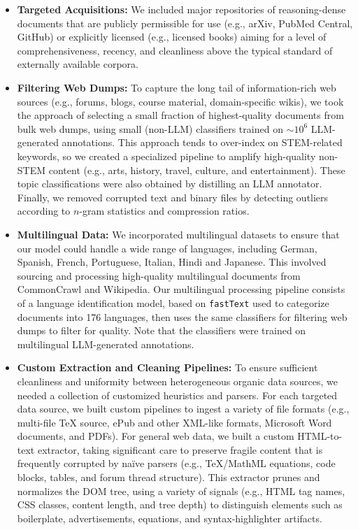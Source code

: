 \begin{itemize}
\item \textbf{Targeted Acquisitions:} We included major repositories of reasoning-dense documents that are publicly permissible for use (e.g., arXiv, PubMed Central, GitHub) or explicitly licensed (e.g., licensed books) aiming for a level of comprehensiveness, recency, and cleanliness above the typical standard of externally available corpora. 
\item \textbf{Filtering Web Dumps:} To capture the long tail of information-rich web sources (e.g., forums, blogs, course material, domain-specific wikis), we took the approach of selecting a small fraction of highest-quality documents from bulk web dumps, using small (non-LLM) classifiers trained on $\sim10^6$ LLM-generated annotations. This approach tends to over-index on STEM-related keywords, so we created a specialized pipeline to amplify high-quality non-STEM content (e.g., arts, history, travel, culture, and entertainment). These topic classifications were also obtained by distilling an LLM annotator. Finally, we removed corrupted text and binary files by detecting outliers according to $n$-gram statistics and compression ratios.
\item \textbf{Multilingual Data:} We incorporated multilingual datasets to ensure that our model could handle a wide range of languages, including German, Spanish, French, Portuguese, Italian, Hindi and Japanese. This involved sourcing and processing high-quality multilingual documents from CommonCrawl and Wikipedia. Our multilingual processing pipeline consists of a language identification model, based on \texttt{fastText} used to categorize documents into 176 languages, then uses the same classifiers for filtering web dumps to filter for quality. Note that the classifiers were trained on multilingual LLM-generated annotations.

\item \textbf{Custom Extraction and Cleaning Pipelines:} To ensure sufficient cleanliness and uniformity between heterogeneous organic data sources, we needed a collection of customized heuristics and parsers. For each targeted data source, we built custom pipelines to ingest a variety of file formats (e.g., multi-file TeX source, ePub and other XML-like formats, Microsoft Word documents, and PDFs). For general web data, we built a custom HTML-to-text extractor, taking significant care to preserve fragile content that is frequently corrupted by na\"ive parsers (e.g., TeX/MathML equations, code blocks, tables, and forum thread structure). This extractor prunes and normalizes the DOM tree, using a variety of signals (e.g., HTML tag names, CSS classes, content length, and tree depth) to distinguish elements such as boilerplate, advertisements, equations, and syntax-highlighter artifacts.
\end{itemize}

